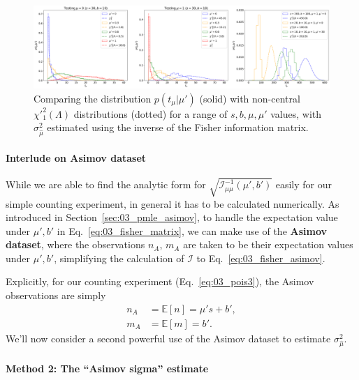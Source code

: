 \begin{figure}[htb]
  \centering
  \includegraphics[width=\textwidth]{figures/03-Stats/06-asymptotic-plr/2.png}
  \caption{Comparing the distribution $p(t_\mu|\mu')$ (solid) with non-central $\chi'^2_1(\Lambda)$ distributions (dotted) for a range of $s, b, \mu, \mu'$ values, with $\sigma^2_{\hat\mu}$ estimated using the inverse of the Fisher information matrix.}
  \label{fig:03_ptmu_asym1}
\end{figure}


\paragraph{Interlude on Asimov dataset}

While we are able to find the analytic form for $\sqrt{\mathcal I^{-1}_{\mu\mu}(\mu', b')}$ easily for our simple counting experiment, in general it has to be calculated numerically.
As introduced in Section~\ref{sec:03_pmle_asimov}, to handle the expectation value under $\mu', b'$ in Eq.~\ref{eq:03_fisher_matrix}, we can make use of the \textbf{Asimov dataset}, where the observations $n_A$, $m_A$ are taken to be their expectation values under $\mu', b'$, simplifying the calculation of $\mathcal I$ to Eq.~\ref{eq:03_fisher_asimov}.

Explicitly, for our counting experiment (Eq.~\ref{eq:03_pois3}), the Asimov observations are simply
\begin{align}
n_A &= \mathbb E[n] = \mu' s + b', \\
m_A &= \mathbb E[m] = b'.
\label{eq:03_asimov_data}
\end{align}
We'll now consider a second powerful use of the Asimov dataset to estimate $\sigma^2_{\hat\mu}$.

\paragraph{Method 2: The ``Asimov sigma'' estimate}


